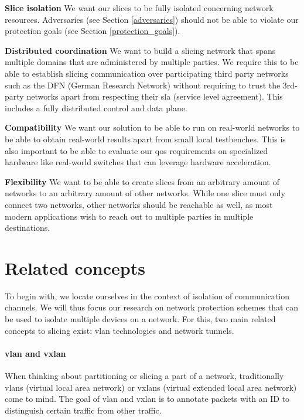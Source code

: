 \begin{description}[style=multiline, labelwidth=0.7cm]
    \item[\namedlabel{R1}{R1}] \textbf{Slice isolation} We want our slices to be fully isolated concerning network resources. Adversaries (see Section \ref{adversaries}) should not be able to violate our protection goals (see Section \ref{protection_goals}).
    \item[\namedlabel{R2}{R2}] \textbf{Distributed coordination} We want to build a slicing network that spans multiple domains that are administered by multiple parties. We require this to be able to establish slicing communication over participating third party networks such as the DFN (German Research Network) without requiring to trust the 3rd-party networks apart from respecting their \acrshort{sla} (service level agreement). This includes a fully distributed control and data plane.
    \item[\namedlabel{R3}{R3}] \textbf{Compatibility} We want our solution to be able to run on real-world networks to be able to obtain real-world results apart from small local testbenches. This is also important to be able to evaluate our \acrshort{qos} requirements on specialized hardware like real-world switches that can leverage hardware acceleration.
    \item[\namedlabel{R4}{R4}] \textbf{Flexibility} We want to be able to create slices from an arbitrary amount of networks to an arbitrary amount of other networks. While one slice must only connect two networks, other networks should be reachable as well, as most modern applications wish to reach out to multiple parties in multiple destinations.
\end{description}


\section{Related concepts}
To begin with, we locate ourselves in the context of isolation of communication channels. We will thus focus our research on network protection schemes that can be used to isolate multiple devices on a network. For this, two main related concepts to slicing exist: \acrshort{vlan} technologies and network tunnels.

\paragraph{\acrshort{vlan} and \acrshort{vxlan}} When thinking about partitioning or slicing a part of a network, traditionally \acrshort{vlan}s (virtual local area network) \cite{IEEE8021Q} or \acrshort{vxlan}s (virtual extended local area network) \cite{rfc7348} come to mind. The goal of \acrshort{vlan} and \acrshort{vxlan} is to annotate packets with an ID to distinguish certain traffic from other traffic.

